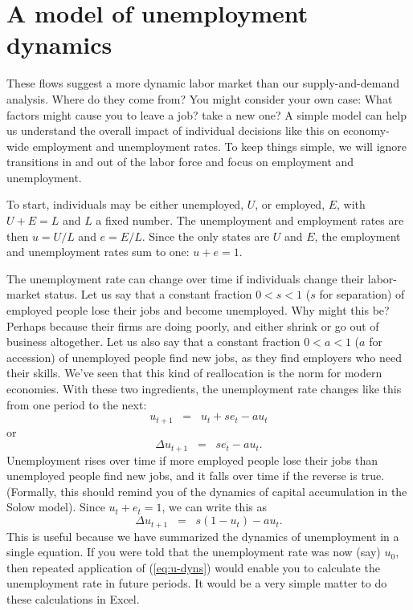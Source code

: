 \section{A model of  unemployment dynamics }

These flows suggest a more dynamic labor market than our supply-and-demand
analysis.
Where do they come from?
You might consider your own case:
What factors might cause you to leave a job?  take a new one?
A simple model can help us understand the overall
impact of individual decisions like this on economy-wide
employment and unemployment rates.
To keep things simple, we will ignore transitions in and out of the labor
force and focus on employment and unemployment.

To start, individuals may be either unemployed, $U$, or employed, $E$, with $U+E={L}$ and $L$ a fixed number.
The unemployment and employment rates are then $u=U/{L}$ and $e=E/{L}$.
Since the only states are $U$ and $E$,
the employment and unemployment rates sum to one: $ u+e=1$.

The unemployment rate can change over time if individuals
change their labor-market status.
Let us say that a constant fraction $0<s<1$ ($s$ for separation)
of employed people lose
their jobs and become unemployed.
Why might this be?  Perhaps because their firms are doing poorly,
and either shrink or go out of business altogether.
Let us also say that a constant fraction $0<a<1$ ($a$ for accession) of
unemployed people find new jobs, as they find employers who need their skills.
We've seen that this kind of reallocation is the norm for modern economies.
With these two ingredients, the unemployment rate changes like this
from one period to the next:
\begin{equation*}
    u_{t+1} \;\;=\;\; u_{t}+se_t-au_t
\end{equation*}
or
\[
    \Delta u_{t+1} \;\;=\;\; se_t-au_t .
\]
Unemployment rises over time if more employed people lose their jobs 
than unemployed people find new jobs, and it falls over time if the reverse is true. 
(Formally, this should remind you of the dynamics of capital accumulation in the Solow  model).
Since $u_t+e_t=1$, we can write this as
\begin{equation}
    \Delta u_{t+1} \;\;=\;\; s (1-u_{t})-a u_{t}.
    \label{eq:u-dyns}
\end{equation}
This is useful because we have summarized the dynamics of unemployment in a single equation.  If you were told that the unemployment rate was now (say)  $u_{0}$, then repeated application of (\ref{eq:u-dyns}) would enable you to calculate the unemployment rate in future periods. It would be a very simple matter to do these calculations in Excel.

